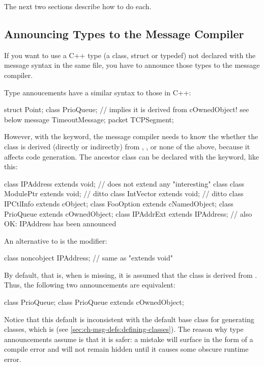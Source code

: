 The next two sections describe how to do each.


\subsection{Announcing Types to the Message Compiler}
\label{sec:ch-msg-defs:announcing-types}

If you want to use a C++ type (a class, struct or typedef) not
declared with the message syntax in the same file, you have to
announce those types to the message compiler.

Type annoucements have a similar syntax to those in C++:

\begin{msg}
struct Point;
class PrioQueue;  // implies it is derived from cOwnedObject! see below
message TimeoutMessage;
packet TCPSegment;
\end{msg}

However, with the  keyword, the message compiler needs to
know the whether the class is derived (directly or indirectly) from
, ,  or none of
the above, because it affects code generation. The ancestor class can be
declared with the  keyword, like this:

\begin{msg}
class IPAddress extends void;  // does not extend any "interesting" class
class ModulePtr extends void;  // ditto
class IntVector extends void;  // ditto
class IPCtlInfo extends cObject;
class FooOption extends cNamedObject;
class PrioQueue extends cOwnedObject;
class IPAddrExt extends IPAddress;  // also OK: IPAddress has been announced
\end{msg}

An alternative to  is the  modifier:

\begin{msg}
class noncobject IPAddress; // same as "extends void"
\end{msg}

By default, that is, when  is missing, it is assumed
that the class is derived from . Thus, the following
two announcements are equivalent:

\begin{msg}
class PrioQueue;
class PrioQueue extends cOwnedObject;
\end{msg}

\begin{note}
Notice that this default is inconsistent with the default base class for
generating classes, which is  (see
\ref{sec:ch-msg-defs:defining-classes}). The reason why type announcements
assume  is that it is safer: a mistake will surface in
the form of a compile error and will not remain hidden until it causes some
obscure runtime error.
\end{note}


